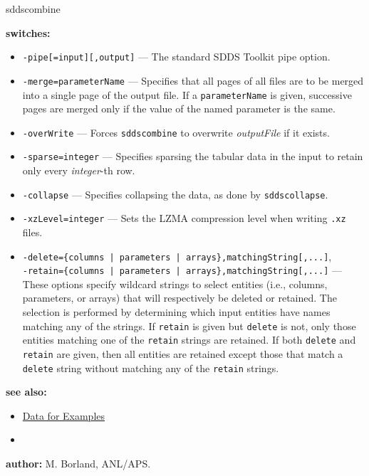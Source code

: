 \begin{sddsprog}{sddscombine}
  \item \textbf{switches:}
    \begin{itemize}
      \item \verb|-pipe[=input][,output]| --- The standard SDDS Toolkit pipe option.
      \item \verb|-merge=parameterName| --- Specifies that all pages of all files are to be merged into a single page of the output file. If a \verb|parameterName| is given, successive pages are merged only if the value of the named parameter is the same.
      \item \verb|-overWrite| --- Forces \verb|sddscombine| to overwrite \emph{outputFile} if it exists.
      \item \verb|-sparse=integer| --- Specifies sparsing the tabular data in the input to retain only every \emph{integer}-th row.
      \item \verb|-collapse| --- Specifies collapsing the data, as done by \verb|sddscollapse|.
      \item \verb|-xzLevel=integer| --- Sets the LZMA compression level when writing \verb|.xz| files.
      \item {\tt -delete=\{columns | parameters | arrays\},matchingString[,...]},\\
            {\tt -retain=\{columns | parameters | arrays\},matchingString[,...]} --- These options specify wildcard strings to select entities (i.e., columns, parameters, or arrays) that will respectively be deleted or retained. The selection is performed by determining which input entities have names matching any of the strings. If \verb|retain| is given but \verb|delete| is not, only those entities matching one of the \verb|retain| strings are retained. If both \verb|delete| and \verb|retain| are given, then all entities are retained except those that match a \verb|delete| string without matching any of the \verb|retain| strings.
    \end{itemize}

  \item \textbf{see also:}
    \begin{itemize}
      \item \hyperref[exampleData]{Data for Examples}
      \item {}
    \end{itemize}

  \item \textbf{author:} M. Borland, ANL/APS.
\end{sddsprog}


